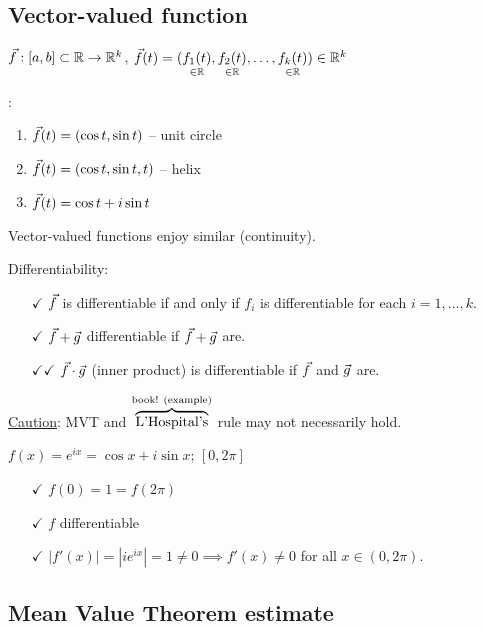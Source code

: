 \documentclass[]{article}
\begin{document}
\subsection*{Vector-valued function}

$\vf:[a,b]\subset\mb R\ra\mb R^k$,
$\vf(t) = (\us{\in\mb R}{f_1(t)},\us{\in\mb R}{f_2(t)},\dots,\us{\in\mb R}{f_k(t)})\in\mb R^k$

\begin{example}:
	\begin{enumerate}
		\item $\vf(t) = (\cos t,\sin t)$ -- unit circle
		\item $\vf(t) = (\cos t,\sin t,t)$ -- helix
		\item $\vf(t) = \cos t+i\sin t$
	\end{enumerate}
\end{example}
Vector-valued functions enjoy similar (continuity).

Differentiability: 
\begin{enumerate}
	\item[$\checkmark$] $\vf$ is differentiable if and only if $f_i$ is differentiable for each $i=1,\dots,k$.
	\item[$\checkmark$] $\vf+\vg$ differentiable if $\vf+\vg$ are.
	\item[$\checkmark\checkmark$] $\vf\cdot\vg$ (inner product) is differentiable if $\vf$ and $\vg$ are.
\end{enumerate}
\ul{Caution}: MVT and $\ob{\text{book! (example)}}{\text{L'Hospital's}}$ rule may not necessarily hold.
\begin{example}
	$f(x) = e^{ix} = \cos x+i\sin x$; $[0,2\pi]$
	\begin{enumerate}
		\item[$\checkmark$] $f(0) = 1 = f(2\pi)$
		\item[$\checkmark$] $f$ differentiable
		\item[$\checkmark$] $|f'(x)| = |ie^{ix}|=1\neq0\implies f'(x)\neq0$ for all $x\in(0,2\pi)$.
	\end{enumerate}
\end{example}

\subsection*{Mean Value Theorem estimate}
\end{document}
